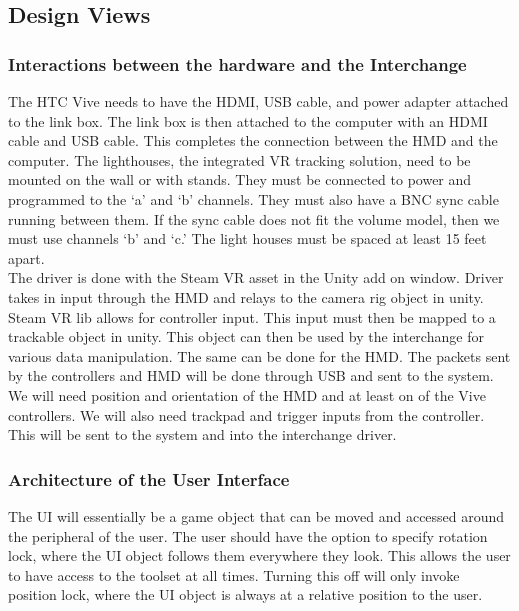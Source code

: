 \documentclass[onecolumn, draftclsnofoot,10pt, compsoc]{IEEEtran}
\begin{document}
\subsection{Design Views}

\subsubsection{Interactions between the hardware and the Interchange}
The HTC Vive needs to have the HDMI, USB cable, and power adapter attached to the link box. The link box is then attached to the computer with an HDMI cable and USB cable. This completes the connection between the HMD and the computer.
The lighthouses, the integrated VR tracking solution, need to be mounted on the wall or with stands. They must be connected to power and programmed to the ‘a’ and ‘b’ channels. They must also have a BNC sync cable running between them. If the sync cable does not fit the volume model, then we must use channels ‘b’ and ‘c.’ The light houses must be spaced at least 15 feet apart. \\

The driver is done with the Steam VR asset in the Unity add on window. Driver takes in input through the HMD and relays to the camera rig object in unity. Steam VR lib allows for controller input. This input must then be mapped to a trackable object in unity. This object can then be used by the interchange for various data manipulation. The same can be done for the HMD. 
The packets sent by the controllers and HMD will be done through USB and sent to the system. We will need position and orientation of the HMD and at least on of the Vive controllers. We will also need trackpad and trigger inputs from the controller. This will be sent to the system and into the interchange driver.\\



\subsubsection{Architecture of the User Interface}
The UI will essentially be a game object that can be moved and accessed around the peripheral of the user. The user should have the option to specify rotation lock, where the UI object follows them everywhere they look. This allows the user to have access to the toolset at all times. Turning this off will only invoke position lock, where the UI object is always at a relative position to the user. \\
\end{document}
